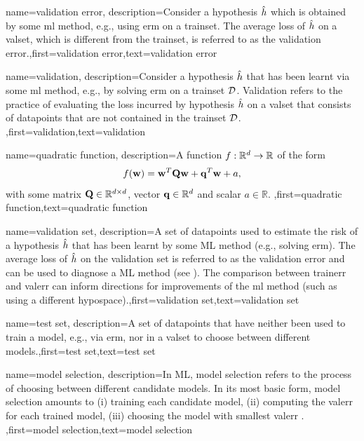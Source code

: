 {name={validation error},
 description={Consider a \gls{hypothesis} $\hat{h}$ which is 
 	obtained by some \gls{ml} method, e.g., using \gls{erm} on a \gls{trainset}. The average \gls{loss} 
 	of $\hat{h}$ on a \gls{valset}, which is different from the \gls{trainset}, is referred 
 	to as the validation error.},first={validation error},text={validation error}  
}

{name={validation},
	description={Consider a \gls{hypothesis} $\hat{h}$ that has been 
		learnt via some \gls{ml} method, e.g., by solving \gls{erm} on a \gls{trainset} $\mathcal{D}$. 
		Validation refers to the practice of evaluating the \gls{loss} incurred by 
		\gls{hypothesis} $\hat{h}$ on a \gls{valset} that consists of 
		\gls{datapoint}s that are not contained in the \gls{trainset} $\mathcal{D}$. },first={validation},text={validation}  
}

{name={quadratic function},
	description={A function $f: \mathbb{R}^{d} \rightarrow \mathbb{R}$ of the form 
	$$f({\bf w}) =  {\bf w}^{T} \mathbf{Q} \mathbf{w} + \mathbf{q}^{T} {\bf w}+a,$$ with 
	some matrix $\mathbf{Q} \in \mathbb{R}^{d \times d}$, vector ${\bf q} \in \mathbb{R}^{d}$ 
	and scalar $a \in \mathbb{R}$.  },first={quadratic function},text={quadratic function}  
}

{name={validation set},
  description={A set of \gls{datapoint}s used to estimate 
  	the \gls{risk} of a \gls{hypothesis} $\hat{h}$ that has been learnt by some 
  	ML method (e.g., solving \gls{erm}). The average \gls{loss} of $\hat{h}$ 
  	on the validation set is referred to as the validation error and can be used to diagnose a 
  	ML method (see \cite[Sec. 6.6.]{MLBasics}). The comparison between \gls{trainerr} 
  	and \gls{valerr} can inform directions for improvements of the \gls{ml} method (such as 
  	using a different \gls{hypospace}).},first={validation set},text={validation set}  
}

{name={test set},
	description={A set of \gls{datapoint}s that have neither 
		been used to train a \gls{model}, e.g., via \gls{erm}, nor in a \gls{valset} 
		to choose between different \gls{model}s.},first={test set},text={test set}  
}


{name={model selection},
	description={In ML, model selection refers to the 
		process of choosing between different candidate \gls{model}s. In its most 
		basic form, \gls{model} selection amounts to (i) training each candidate \gls{model}, 
		(ii) computing the \gls{valerr} for each trained \gls{model}, (iii) choosing the \gls{model} 
		with smallest \gls{valerr} \cite[Ch. 6]{MLBasics}. },first={model selection},text={model selection}  
}





